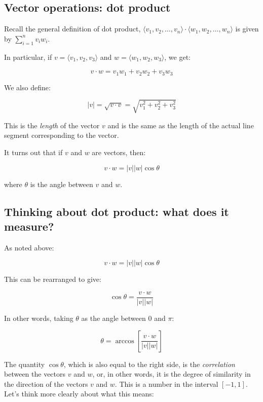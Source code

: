 \documentclass[10pt]{amsart}
\begin{document}
\subsection{Vector operations: dot product}

Recall the general definition of dot product, $\langle v_1, v_2,
\dots, v_n \rangle \cdot \langle w_1, w_2, \dots, w_n \rangle$ is
given by $\sum_{i=1}^n v_iw_i$.

In particular, if $v = \langle v_1,v_2,v_3 \rangle$ and $w = \langle
w_1,w_2,w_3 \rangle$, we get:

$$v \cdot w = v_1w_1 + v_2w_2 + v_3w_3$$

We also define:

$$|v| = \sqrt{v \cdot v} = \sqrt{v_1^2 + v_2^2 + v_3^2}$$

This is the {\em length} of the vector $v$ and is the same as the
length of the actual line segment corresponding to the vector.

It turns out that if $v$ and $w$ are vectors, then:

$$v \cdot w = |v||w| \cos \theta$$

where $\theta$ is the angle between $v$ and $w$.

\subsection{Thinking about dot product: what does it measure?}

As noted above:

$$v \cdot w = |v||w| \cos \theta$$

This can be rearranged to give:

$$\cos \theta = \frac{v \cdot w}{|v||w|}$$

In other words, taking $\theta$ as the angle between $0$ and $\pi$:

$$\theta = \arccos\left[ \frac{v \cdot w}{|v||w|}\right]$$

The quantity $\cos \theta$, which is also equal to the right side, is
the {\em correlation} between the vectors $v$ and $w$, or, in other
words, it is the degree of similarity in the direction of the vectors
$v$ and $w$. This is a number in the interval $[-1,1]$. Let's think more
clearly about what this means:
\end{document}
